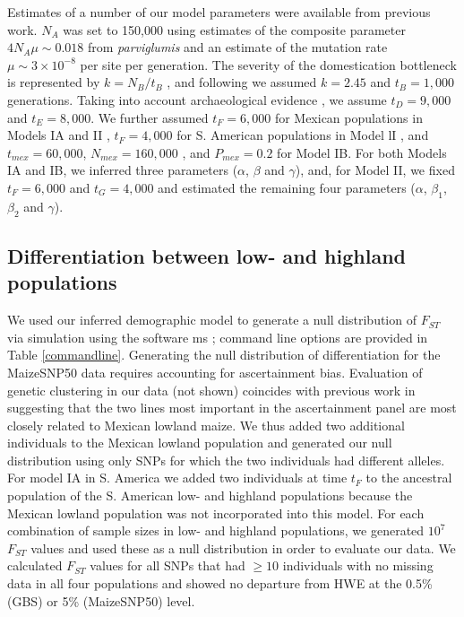 Estimates of a number of our model parameters were available from previous work.    
$N_A$ was set to 150,000 using estimates of the composite parameter $4N_A\mu \sim 0.018$ from \emph{parviglumis}  \cite[]{Eyre-Walker_1998_9539756,Tenaillon_2001_11470895,Tenaillon_2004_15014173,Wright_2005_15919994,Ross-Ibarra_2009_19153259} and an estimate of the mutation rate $\mu \sim 3\times 10^{-8}$ \cite[]{Clark_2005_16079248} per site per generation.  
The severity of the domestication bottleneck is represented by $k=N_B/t_B$ \cite[]{Eyre-Walker_1998_9539756,Wright_2005_15919994}, and following \cite{Wright_2005_15919994} we assumed $k=2.45$ and $t_B=1,000$ generations.  
Taking into account archaeological evidence \cite[]{Piperno_2009_19307570}, we assume $t_D=9,000$ and $t_E=8,000$.  
We further assumed $t_F=6,000$ for Mexican populations in Models IA and II \cite[]{Piperno_2006_69}, $t_F=4,000$ for S. American populations in Model lI \cite[]{Perry_2006_16511492}, and $t_{mex}=60,000$, $N_{mex}=160,000$ \cite[]{Ross-Ibarra_2009_19153259}, and $P_{mex}=0.2$ \cite[]{vanHeerwaarden_2011_21189301} for Model IB. 
For both Models IA and IB, we inferred three parameters ($\alpha$, $\beta$ and $\gamma$), and, for Model II, we fixed $t_F=6,000$ and $t_G=4,000$ \cite[]{Piperno_2006_69,Perry_2006_16511492}  and estimated the remaining four parameters ($\alpha$, $\beta_1$, $\beta_2$ and $\gamma$).


\subsection*{Differentiation between low- and highland populations}
We used our inferred demographic model to generate a null distribution of $F_{ST}$ via simulation using the software {\sf ms} \cite[]{Hudson_2002_11847089}; command line options are provided in Table \ref{commandline}.  
Generating the null distribution of differentiation for the MaizeSNP50 data requires accounting for ascertainment bias. 
Evaluation of genetic clustering in our data (not shown) coincides with previous work \cite[]{Hufford_2012_22660546} in suggesting that the two lines most important in the ascertainment panel are most closely related to Mexican lowland maize.  
We thus added two additional individuals to the Mexican lowland population and generated our null distribution using only SNPs for which the two individuals had different alleles. For model IA in S. America we added two individuals at time $t_F$ to the ancestral population of the S. American low- and highland populations because the Mexican lowland population was not incorporated into this model. 
For each combination of sample sizes in low- and highland populations, we generated $10^7$ $F_{ST}$ values and used these as a null distribution in order to evaluate our data.   
We calculated $F_{ST}$ values for all SNPs that had $\geq10$ individuals with no missing data in all four populations and showed no departure from HWE at the 0.5\% (GBS) or 5\% (MaizeSNP50) level. 


